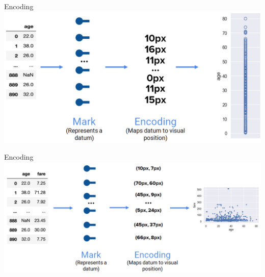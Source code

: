 \documentclass[aspectratio=169]{../latex_main/tntbeamer}  %
\begin{document}
	
	\begin{frame}[c]{Encoding}
	    \centering
	    \includegraphics[scale=.4]{Bild13}
	\end{frame}
	
	
	
	\begin{frame}[c]{Encoding}
	    \centering
	    \includegraphics[scale=.4]{Bild14}
	\end{frame}
	
	
\end{document}

